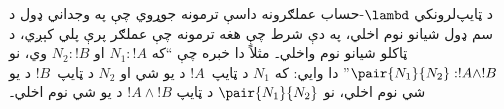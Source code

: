 \documentclass[../../../include/open-logic-section]{subfiles}
\begin{document}
د ټايپ‌لرونکي $\lambd$-حساب عملګرونه داسې ترمونه
جوړوي چې په وجداني ډول د سم ډول شيانو نوم اخلي، په
دې شرط چې هغه ترمونه چې عملګر پرې پلي کېږي، د ټاکلو
شيانو نوم واخلي۔ مثلاً دا خبره چې ``که $N_1 : !A$ او
$N_2 : !B$ وي، نو $\pair{N_1}{N_2} : !A \land !B$''
دا وايي: که $N_1$ د ټايپ~$!A$ د يو شي او $N_2$
د ټايپ~$!B$ د يو شي نوم اخلي، نو $\pair{N_1}{N_2}$
د ټايپ $!A \land !B$ د يو شي نوم اخلي۔
\end{document}
